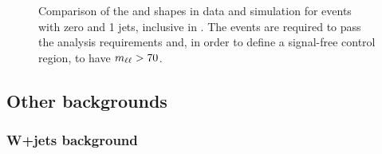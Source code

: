 \begin{figure}[htb]
{}

\caption{Comparison of the \mll and \mt shapes in data and simulation for events with zero and 1 jets, inclusive in \pth. The events are required to pass the analysis requirements and, in order to define a signal-free control region, to have $m_{\ell\ell} > 70$\GeV.\label{fig:WW}}
\end{figure}











































\subsection{Other backgrounds\label{sec:OtherBackgrounds}}

	\subsubsection{W+jets background\label{sec:wjetsbkg}}	
	
